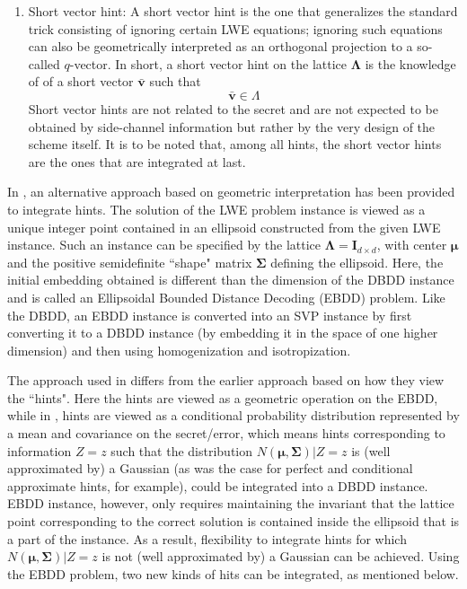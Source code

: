 \begin{enumerate}
    \item Short vector hint: A short vector hint is the one that generalizes the standard trick consisting of ignoring certain LWE equations; ignoring such equations can also be geometrically interpreted as an orthogonal projection to a so-called $q$-vector. In short, a short vector hint on the lattice $\pmb{\Lambda}$ is the knowledge of of a short vector $\bar{\pmb{v}}$ such that
          \begin{equation*}
              \bar{\pmb{v}}\in \Lambda
          \end{equation*}
          Short vector hints are not related to the secret and are not expected to be obtained by side-channel information but rather by the very design of the scheme itself. It is to be noted that, among all hints, the short vector hints are the ones that are integrated at last.
\end{enumerate}



In \cite{cryptoeprint:2022/1345}, an alternative approach based on geometric interpretation has been provided to integrate hints. The solution of the LWE problem instance is viewed as a unique integer point contained in an ellipsoid constructed from the given LWE instance. Such an instance can be specified by the lattice $\pmb{\Lambda} = \pmb{I}_{d\times d}$, with center $\pmb{\mu}$ and the positive semidefinite ``shape" matrix $\pmb{\Sigma}$ defining the ellipsoid. Here, the initial embedding obtained is different than the dimension of the DBDD instance and is called an Ellipsoidal Bounded Distance Decoding (EBDD) problem. Like the DBDD, an EBDD instance is converted into an SVP instance by first converting it to a DBDD instance (by embedding it in the space of one higher dimension) and then using homogenization and isotropization.

The approach used in \cite{cryptoeprint:2022/1345} differs from the earlier approach based on how they view the ``hints". Here the hints are viewed as a geometric operation on the EBDD, while in \cite{dachman2020lwe}, hints are viewed as a conditional probability distribution represented by a mean and covariance on the secret/error, which means hints corresponding to information $Z = z$ such that the distribution $N(\pmb{\mu, \Sigma}) | Z = z$ is (well approximated by) a Gaussian (as was the case for perfect and conditional approximate hints, for example), could be integrated into a DBDD instance. EBDD instance, however, only requires maintaining the invariant that the lattice point corresponding to the correct solution is contained inside the ellipsoid that is a part of the instance. As a result, flexibility to integrate hints for which $N(\pmb{\mu}, \pmb{\Sigma}) | Z = z$ is not (well approximated by) a Gaussian can be achieved. Using the EBDD problem, two new kinds of hits can be integrated, as mentioned below.

